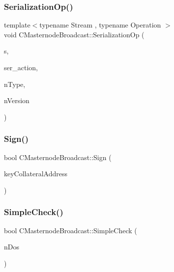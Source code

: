 \mbox{\label{class_c_masternode_broadcast_a6e697696503e9416437067cb33edc084}} 
\subsubsection{\texorpdfstring{Serialization\+Op()}{SerializationOp()}}
{\footnotesize\ttfamily template$<$typename Stream , typename Operation $>$ \\
void C\+Masternode\+Broadcast\+::\+Serialization\+Op (\begin{DoxyParamCaption}\item[{Stream \&}]{s,  }\item[{Operation}]{ser\+\_\+action,  }\item[{int}]{n\+Type,  }\item[{int}]{n\+Version }\end{DoxyParamCaption})\hspace{0.3cm}{\ttfamily [inline]}}

\mbox{\label{class_c_masternode_broadcast_a60496c36bcb74c3f5516faac1a08b376}} 
\subsubsection{\texorpdfstring{Sign()}{Sign()}}
{\footnotesize\ttfamily bool C\+Masternode\+Broadcast\+::\+Sign (\begin{DoxyParamCaption}\item[{\mbox{\hyperlink{class_c_key}{C\+Key}} \&}]{key\+Collateral\+Address }\end{DoxyParamCaption})}

\mbox{\label{class_c_masternode_broadcast_a614b26e3fa8e0151889ce4fc0bebd88e}} 
\subsubsection{\texorpdfstring{Simple\+Check()}{SimpleCheck()}}
{\footnotesize\ttfamily bool C\+Masternode\+Broadcast\+::\+Simple\+Check (\begin{DoxyParamCaption}\item[{int \&}]{n\+Dos }\end{DoxyParamCaption})}

